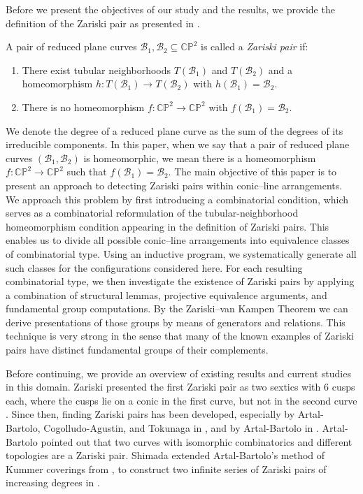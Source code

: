 \documentclass{svproc}
\begin{document}
Before we present the objectives of our study and the results, we provide the definition of the Zariski pair as presented in \cite{Bartolo_tokunaga_survey}.
\begin{definition}\label{def:zariski_pairs}
A pair of reduced plane curves $ \mathcal{B}_1,\mathcal{B}_2 \subseteq \mathbb{CP}^2 $ is called a \emph{Zariski pair} if:
\begin{enumerate}
	\item There exist tubular neighborhoods $ T(\mathcal{B}_1) $ and  $ T(\mathcal{B}_2) $ and a homeomorphism
	$ h: T(\mathcal{B}_1)\to T(\mathcal{B}_2) $ with $ h(\mathcal{B}_1)=\mathcal{B}_2 $.
	
	\item There is no homeomorphism $ f:\mathbb{CP}^2\to \mathbb{CP}^2 $ with $ f(\mathcal{B}_1)=\mathcal{B}_2 $.
\end{enumerate}
\end{definition}

We denote the degree of a reduced plane curve as the sum of the degrees of its irreducible components.
In this paper, when we say that a pair of reduced plane curves $(\mathcal{B}_1,\mathcal{B}_2)$ is homeomorphic, we mean there is a homeomorphism $f : \mathbb{CP}^2 \rightarrow \mathbb{CP}^2$ such that $f(\mathcal{B}_1) = \mathcal{B}_2$.
The main objective of this paper is to present an approach to detecting Zariski pairs within conic--line arrangements.
We approach this problem by first introducing a combinatorial condition, which serves as a combinatorial reformulation of the tubular-neighborhood homeomorphism condition appearing in the definition of Zariski pairs. This enables us to divide all possible conic–line arrangements into equivalence classes of combinatorial type. Using an inductive program, we systematically generate all such classes for the configurations considered here. For each resulting combinatorial type, we then investigate the existence of Zariski pairs by applying a combination of structural lemmas, projective equivalence arguments, and fundamental group computations. By the Zariski--van Kampen Theorem \cite{vanKampen33} we can derive presentations of those groups by means of generators and relations.
This technique is very strong in the sense that many of the known examples of Zariski pairs have distinct fundamental groups of their complements.

Before continuing, we provide an overview of existing results and current studies in this domain.
Zariski presented the first Zariski pair as two sextics with 6 cusps each, where the cusps lie on a conic in the first curve, but not in the second curve \cite{zariski29}.
 Since then, finding Zariski pairs has been developed, especially by Artal-Bartolo, Cogolludo-Agustin, and Tokunaga in \cite{Bartolo_tokunaga_survey}, and by Artal-Bartolo in \cite{Bartolo94}. Artal-Bartolo pointed out that two curves with isomorphic combinatorics and different topologies are a Zariski pair.
 Shimada extended Artal-Bartolo's method of Kummer coverings from \cite{Bartolo94}, to construct two infinite series of Zariski pairs of increasing degrees in \cite{shimada}.
\end{document}
